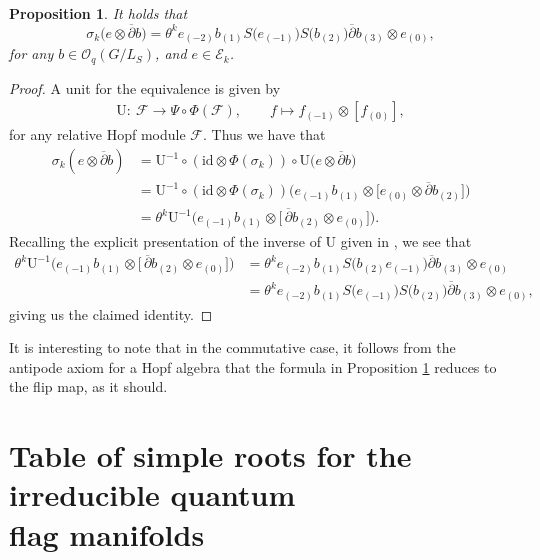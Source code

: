 \documentclass[pdftex]{sigma}
\numberwithin{equation}{section}
\newtheorem{prop}[Theorem]{Proposition}
 { \theoremstyle{definition}
\newtheorem{defn}[Theorem]{Definition}
\newtheorem{Note}[Theorem]{Note}
\newtheorem{eg}[Theorem]{Example}
\newtheorem{Remark}[Theorem]{Remark} }
\newcommand\adel{\overline{\partial}}
\newcommand\unit{\mathrm{U}}
\begin{document}
\begin{prop} \label{prop:Global.Tak}It holds that
\[
\sigma_{k}\big(e \otimes \adel b\big) = \theta^k e_{(-2)} b_{(1)} S\big(e_{(-1)}\big)S\big(b_{(2)}\big)\adel b_{(3)} \otimes e_{(0)},
\]
for any $b \in \mathcal{O}_q(G/L_S)$, and $e \in \mathcal{E}_k$.
\end{prop}
\begin{proof}
A unit for the equivalence is given by
\begin{gather*}
\unit\colon \ \mathcal{F} \to \Psi \circ \Phi(\mathcal{F}), \qquad f \mapsto f_{(-1)} \otimes [f_{(0)}],
\end{gather*}
for any relative Hopf module $\mathcal{F}$. Thus we have that
\begin{align*}
\sigma_k(e \otimes \adel b) &= \unit^{-1} \circ (\mathrm{id} \otimes \Phi(\sigma_k)) \circ \unit\big(e \otimes \adel b\big)\\
&= \unit^{-1} \circ (\mathrm{id} \otimes \Phi(\sigma_k))\big(e_{(-1)}b_{(1)} \otimes \big[e_{(0)} \otimes \adel b_{(2)}\big]\big)\\
&= \theta^k \unit^{-1} \big(e_{(-1)}b_{(1)} \otimes \big[\,\adel b_{(2)} \otimes e_{(0)}\big]\big).
\end{align*}
Recalling the explicit presentation of the inverse of $\unit$ given in \cite[Corollary~2.7]{MMF2}, we see that
\begin{align*}
\theta^k \unit^{-1} \big(e_{(-1)}b_{(1)} \otimes \big[\,\adel b_{(2)} \otimes e_{(0)}\big]\big) &= \theta^k e_{(-2)}b_{(1)} S\big(b_{(2)}e_{(-1)}\big)\adel b_{(3)} \otimes e_{(0)}\\
&= \theta^k e_{(-2)} b_{(1)} S\big(e_{(-1)}\big)S\big(b_{(2)}\big)\adel b_{(3)} \otimes e_{(0)},
\end{align*}
giving us the claimed identity.
\end{proof}

It is interesting to note that in the commutative case, it follows from the antipode axiom for a Hopf algebra that the formula in Proposition \ref{prop:Global.Tak} reduces to the flip map, as it should.

\appendix


\section[Table of simple roots for the irreducible quantum flag manifolds]{Table of simple roots for the irreducible quantum\\ flag manifolds}\label{appendixA}
\end{document}
